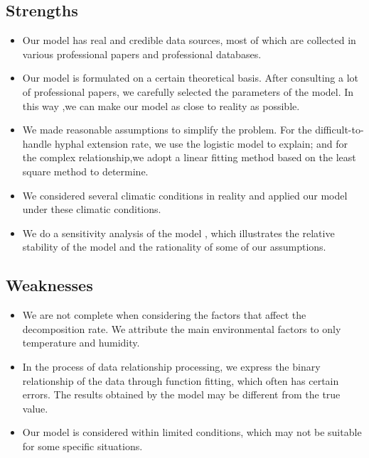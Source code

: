 \documentclass{mcmthesis}
\begin{document}
\subsection{Strengths}
\begin{itemize}
	\item
	Our model has real and credible data sources, most of which are collected in various professional papers and professional databases.
	\item 
	Our model is formulated on a certain theoretical basis. After consulting a lot of professional papers, we carefully selected the parameters of the model. In this way ,we can make our model as close to reality as possible.
	\item 
	We made reasonable assumptions to simplify the problem. For the difficult-to-handle hyphal extension rate, we use the logistic model to explain; and for the complex relationship,we adopt a linear fitting method based on the least square method to determine.  
	\item 
	We considered several climatic conditions in reality and applied our model under these climatic conditions. 
	\item 
	We do a sensitivity analysis of the model , which illustrates the relative stability of the model and the rationality of some of our assumptions.
\end{itemize}

\subsection{Weaknesses}
\begin{itemize}
	\item 
	We are not complete when considering the factors that affect the decomposition rate. We attribute the main environmental factors to only temperature and humidity.
	\item 
	In the process of data relationship processing, we express the binary relationship of the data through function fitting, which often has certain errors. The results obtained by the model may be different from the true value. 
	\item 
	Our model is considered within limited conditions, which may not be suitable for some specific situations.
\end{itemize}
\end{document}
